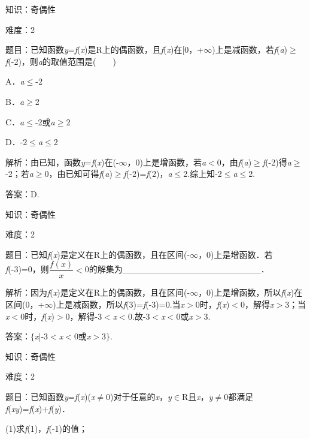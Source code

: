 \documentclass{article} %
\begin{document}
知识：奇偶性

难度：2

题目：已知函数\textit{y}=\textit{f}(\textit{x})是R上的偶函数，且\textit{f}(\textit{x})在[0，+$\mathrm{\infty}$)上是减函数，若\textit{f}(\textit{a})$\mathrm{\ge}$\textit{f}(-2)，则\textit{a}的取值范围是(　　)

A．\textit{a}$\mathrm{\le}$-2   

B．\textit{a}$\mathrm{\ge}$2

C．\textit{a}$\mathrm{\le}$-2或\textit{a}$\mathrm{\ge}$2   

D．-2$\mathrm{\le}$\textit{a}$\mathrm{\le}$2

解析：由已知，函数\textit{y}=\textit{f}(\textit{x})在(-$\mathrm{\infty}$，0)上是增函数，若\textit{a}$\mathrm{<}$0，由\textit{f}(\textit{a})$\mathrm{\ge}$\textit{f}(-2)得\textit{a}$\mathrm{\ge}$-2；若\textit{a}$\mathrm{\ge}$0，由已知可得\textit{f}(\textit{a})$\mathrm{\ge}$\textit{f}(-2)=\textit{f}(2)，\textit{a}$\mathrm{\le}$2.综上知-2$\mathrm{\le}$\textit{a}$\mathrm{\le}$2.

答案：D.

知识：奇偶性

难度：2

题目：已知\textit{f}(\textit{x})是定义在R上的偶函数，且在区间(-$\mathrm{\infty}$，0)上是增函数．若\textit{f}(-3)=0，则$\dfrac{f(x)}{x}$$\mathrm{<}$0的解集为\_\_\_\_\_\_\_\_\_\_\_\_\_\_\_\_\_\_\_\_\_\_．

解析：因为\textit{f}(\textit{x})是定义在R上的偶函数，且在区间(-$\mathrm{\infty}$，0)上是增函数，所以\textit{f}(\textit{x})在区间(0，+$\mathrm{\infty}$)上是减函数，所以\textit{f}(3)=\textit{f}(-3)=0.当\textit{x}$\mathrm{>}$0时，\textit{f}(\textit{x})$\mathrm{<}$0，解得\textit{x}$\mathrm{>}$3；当\textit{x}$\mathrm{<}$0时，\textit{f}(\textit{x})$\mathrm{>}$0，解得-3$\mathrm{<}$\textit{x}$\mathrm{<}$0.故-3$\mathrm{<}$\textit{x}$\mathrm{<}$0或\textit{x}$\mathrm{>}$3.

答案：$\mathrm{\{}$\textit{x}|-3$\mathrm{<}$\textit{x}$\mathrm{<}$0或\textit{x}$\mathrm{>}$3$\mathrm{\}}$.

知识：奇偶性

难度：2

题目：已知函数\textit{y}=\textit{f}(\textit{x})(\textit{x}$\mathrm{\neq}$0)对于任意的\textit{x}，\textit{y}$\mathrm{\in}$R且\textit{x}，\textit{y}$\mathrm{\neq}$0都满足\textit{f}(\textit{xy})=\textit{f}(\textit{x})+\textit{f}(\textit{y})．

(1)求\textit{f}(1)，\textit{f}(-1)的值；
\end{document}
